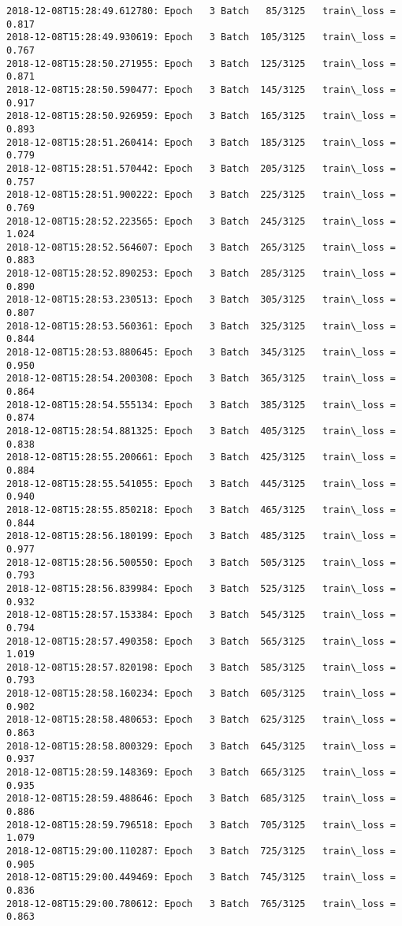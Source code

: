\documentclass[11pt]{article}
\begin{document}
\begin{Verbatim}[commandchars=\\\{\}]
2018-12-08T15:28:49.612780: Epoch   3 Batch   85/3125   train\_loss = 0.817
2018-12-08T15:28:49.930619: Epoch   3 Batch  105/3125   train\_loss = 0.767
2018-12-08T15:28:50.271955: Epoch   3 Batch  125/3125   train\_loss = 0.871
2018-12-08T15:28:50.590477: Epoch   3 Batch  145/3125   train\_loss = 0.917
2018-12-08T15:28:50.926959: Epoch   3 Batch  165/3125   train\_loss = 0.893
2018-12-08T15:28:51.260414: Epoch   3 Batch  185/3125   train\_loss = 0.779
2018-12-08T15:28:51.570442: Epoch   3 Batch  205/3125   train\_loss = 0.757
2018-12-08T15:28:51.900222: Epoch   3 Batch  225/3125   train\_loss = 0.769
2018-12-08T15:28:52.223565: Epoch   3 Batch  245/3125   train\_loss = 1.024
2018-12-08T15:28:52.564607: Epoch   3 Batch  265/3125   train\_loss = 0.883
2018-12-08T15:28:52.890253: Epoch   3 Batch  285/3125   train\_loss = 0.890
2018-12-08T15:28:53.230513: Epoch   3 Batch  305/3125   train\_loss = 0.807
2018-12-08T15:28:53.560361: Epoch   3 Batch  325/3125   train\_loss = 0.844
2018-12-08T15:28:53.880645: Epoch   3 Batch  345/3125   train\_loss = 0.950
2018-12-08T15:28:54.200308: Epoch   3 Batch  365/3125   train\_loss = 0.864
2018-12-08T15:28:54.555134: Epoch   3 Batch  385/3125   train\_loss = 0.874
2018-12-08T15:28:54.881325: Epoch   3 Batch  405/3125   train\_loss = 0.838
2018-12-08T15:28:55.200661: Epoch   3 Batch  425/3125   train\_loss = 0.884
2018-12-08T15:28:55.541055: Epoch   3 Batch  445/3125   train\_loss = 0.940
2018-12-08T15:28:55.850218: Epoch   3 Batch  465/3125   train\_loss = 0.844
2018-12-08T15:28:56.180199: Epoch   3 Batch  485/3125   train\_loss = 0.977
2018-12-08T15:28:56.500550: Epoch   3 Batch  505/3125   train\_loss = 0.793
2018-12-08T15:28:56.839984: Epoch   3 Batch  525/3125   train\_loss = 0.932
2018-12-08T15:28:57.153384: Epoch   3 Batch  545/3125   train\_loss = 0.794
2018-12-08T15:28:57.490358: Epoch   3 Batch  565/3125   train\_loss = 1.019
2018-12-08T15:28:57.820198: Epoch   3 Batch  585/3125   train\_loss = 0.793
2018-12-08T15:28:58.160234: Epoch   3 Batch  605/3125   train\_loss = 0.902
2018-12-08T15:28:58.480653: Epoch   3 Batch  625/3125   train\_loss = 0.863
2018-12-08T15:28:58.800329: Epoch   3 Batch  645/3125   train\_loss = 0.937
2018-12-08T15:28:59.148369: Epoch   3 Batch  665/3125   train\_loss = 0.935
2018-12-08T15:28:59.488646: Epoch   3 Batch  685/3125   train\_loss = 0.886
2018-12-08T15:28:59.796518: Epoch   3 Batch  705/3125   train\_loss = 1.079
2018-12-08T15:29:00.110287: Epoch   3 Batch  725/3125   train\_loss = 0.905
2018-12-08T15:29:00.449469: Epoch   3 Batch  745/3125   train\_loss = 0.836
2018-12-08T15:29:00.780612: Epoch   3 Batch  765/3125   train\_loss = 0.863

\end{Verbatim}
\end{document}
